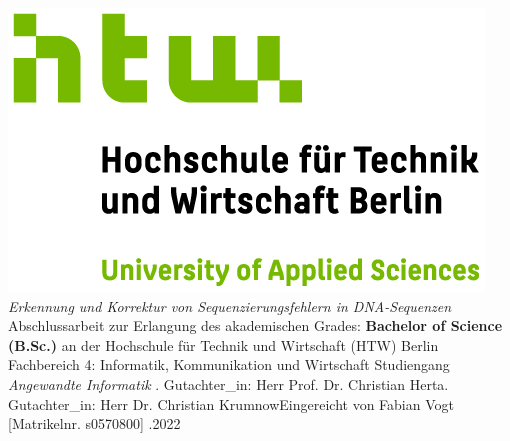 \documentclass[oneside,bibliography=totocnumbered,BCOR=5mm]{scrbook}%
\theoremstyle{definition}
\theoremstyle{definition}
\theoremstyle{definition}
\theoremstyle{definition}
\theoremstyle{definition}
\theoremstyle{definition}
\begin{document}
\begin{titlepage}
\begin{center}
\includegraphics{images/HTW_Berlin_Logo_farbig.jpg}
\linebreak[4]
\linebreak[4]
\linebreak[4]
\linebreak[4]
\textit{\large Erkennung und Korrektur von Sequenzierungsfehlern in DNA-Sequenzen}
\linebreak[4]
\linebreak[4]
\linebreak[4]
Abschlussarbeit 
\linebreak[4]
\linebreak[4]
zur Erlangung des akademischen Grades: 
\linebreak[4]
\linebreak[4]
\textbf{Bachelor of Science (B.Sc.)} 
\linebreak[4]
\linebreak[4]
an der
\linebreak[4]
\linebreak[4]
Hochschule für Technik und Wirtschaft (HTW) Berlin
\linebreak[4]
Fachbereich 4: Informatik, Kommunikation und Wirtschaft
\linebreak[4]
Studiengang \textit{Angewandte Informatik}
\linebreak[4]
\linebreak[4]
. Gutachter\_in: Herr Prof. Dr. Christian Herta. Gutachter\_in: Herr Dr. Christian Krumnow\linebreak[4]
\linebreak[4]
\linebreak[4]
\linebreak[4]
\linebreak[4]
Eingereicht von Fabian Vogt [Matrikelnr. s0570800]
\linebreak[4]
\linebreak[4]
\linebreak[4]
.2022

\end{center}
\end{titlepage}
\newpage    %
\end{document}
